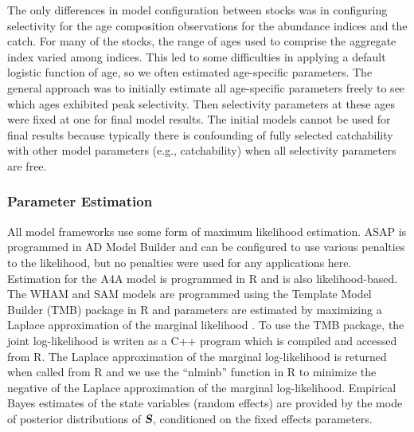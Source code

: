\documentclass[12pt,letterpaper, leqno]{article}
\begin{document}
The only differences in model configuration between stocks was in configuring selectivity for the age composition observations for the abundance indices and the catch. For many of the stocks, the range of ages used to comprise the aggregate index varied among indices. This led to some difficulties in applying a default logistic function of age, so we often estimated age-specific parameters. The general approach was to initially estimate all age-specific parameters freely to see which ages exhibited peak selectivity. Then selectivity parameters at these ages were fixed at one for final model results. The initial models cannot be used for final results because typically there is confounding of fully selected catchability with other model parameters (e.g., catchability) when all selectivity parameters are free.



\subsubsection*{Parameter Estimation}


All model frameworks use some form of maximum likelihood estimation. ASAP is programmed in AD Model Builder \citep{fournieretal12} and can be configured to use various penalties to the likelihood, but no penalties were used for any applications here. Estimation for the A4A model is programmed in R \citep{R18} and is also likelihood-based. The WHAM and SAM models are programmed using the Template Model Builder (TMB) package in R \citep{kristensenetal16} and parameters are estimated by maximizing a Laplace approximation of the marginal likelihood \citep{skaugfournier06}. To use the TMB package, the joint log-likelihood is writen as a C++ program which is compiled and accessed from R. The Laplace approximation of the marginal log-likelihood is returned when called from R and we use the ``nlminb'' function in R to minimize the negative of the Laplace approximation of the marginal log-likelihood. Empirical Bayes estimates of the state variables (random effects) are provided by the mode of posterior distributions of $\textsl{\textbf{S}}$, conditioned on the fixed effects parameters.
\end{document}
